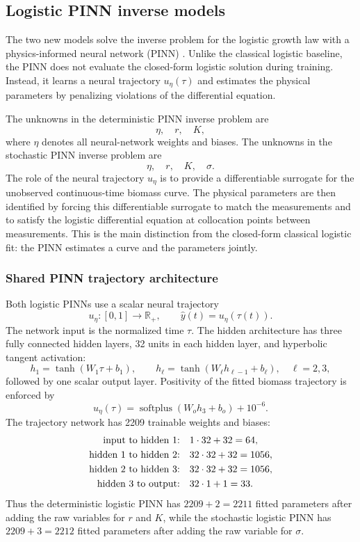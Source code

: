 \documentclass[11pt]{article}
\begin{document}
\subsection{Logistic PINN inverse models}

The two new models solve the inverse problem for the logistic growth law with a
physics-informed neural network (PINN) \citep{raissi2019physics}. Unlike the
classical logistic baseline, the PINN does not evaluate the closed-form
logistic solution during training. Instead, it learns a neural trajectory
$u_\eta(\tau)$ and estimates the physical parameters by penalizing violations
of the differential equation.

The unknowns in the deterministic PINN inverse problem are
$$
  \eta,\quad r,\quad K,
$$
where $\eta$ denotes all neural-network weights and biases. The unknowns in the
stochastic PINN inverse problem are
$$
  \eta,\quad r,\quad K,\quad \sigma.
$$
The role of the neural trajectory $u_\eta$ is to provide a differentiable
surrogate for the unobserved continuous-time biomass curve. The physical
parameters are then identified by forcing this differentiable surrogate to
match the measurements and to satisfy the logistic differential equation at
collocation points between measurements. This is the main distinction from the
closed-form classical logistic fit: the PINN estimates a curve and the
parameters jointly.

\subsubsection{Shared PINN trajectory architecture}

Both logistic PINNs use a scalar neural trajectory
$$
  u_\eta:[0,1]\rightarrow \mathbb R_+,
  \qquad
  \widehat y(t)=u_\eta(\tau(t)).
$$
The network input is the normalized time $\tau$. The hidden architecture has
three fully connected hidden layers, 32 units in each hidden layer, and
hyperbolic tangent activation:
$$
  h_1=\tanh(W_1\tau+b_1),\qquad
  h_\ell=\tanh(W_\ell h_{\ell-1}+b_\ell),\quad \ell=2,3,
$$
followed by one scalar output layer. Positivity of the fitted biomass
trajectory is enforced by
$$
  u_\eta(\tau)=\operatorname{softplus}(W_o h_3+b_o)+10^{-6}.
$$
The trajectory network has 2209 trainable weights and biases:
$$
\begin{aligned}
  \hbox{input to hidden 1:}&\quad 1\cdot 32+32=64,\\
  \hbox{hidden 1 to hidden 2:}&\quad 32\cdot 32+32=1056,\\
  \hbox{hidden 2 to hidden 3:}&\quad 32\cdot 32+32=1056,\\
  \hbox{hidden 3 to output:}&\quad 32\cdot 1+1=33.
\end{aligned}
$$
Thus the deterministic logistic PINN has $2209+2=2211$ fitted parameters after
adding the raw variables for $r$ and $K$, while the stochastic logistic PINN
has $2209+3=2212$ fitted parameters after adding the raw variable for
$\sigma$.
\end{document}
